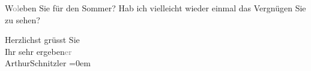 \pstart
           W\textcolor{gray}{o}\textcolor{gray}{l}eben Sie für den Sommer? Hab ich vielleicht wieder einmal das
               Vergnügen Sie zu sehen?\pend
           
\pstart
           Herzlichst grüsst Sie{\\[\baselineskip]}Ihr sehr ergeben\textcolor{gray}{er}{\\[\baselineskip]}\spacefill\mbox{ArthurSchnitzler}\pend
           \leftskip=0em{}\endnumbering{}  
      